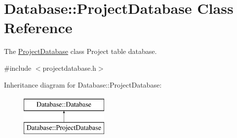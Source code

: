 \hypertarget{classDatabase_1_1ProjectDatabase}{\section{Database\+:\+:Project\+Database Class Reference}
\label{classDatabase_1_1ProjectDatabase}
}


The \hyperlink{classDatabase_1_1ProjectDatabase}{Project\+Database} class Project table database.  




{\ttfamily \#include $<$projectdatabase.\+h$>$}

Inheritance diagram for Database\+:\+:Project\+Database\+:\begin{figure}[H]
\begin{center}
\leavevmode
\includegraphics[height=2.000000cm]{dd/dbf/classDatabase_1_1ProjectDatabase}
\end{center}
\end{figure}
